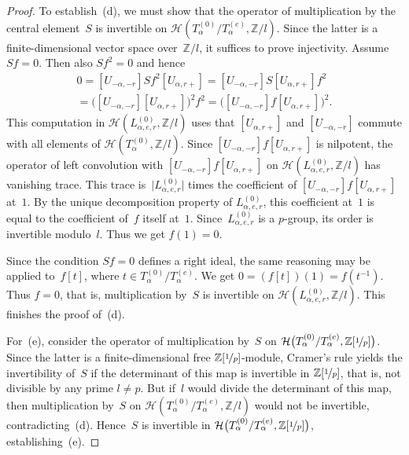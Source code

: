 \documentclass{amsart}
\theoremstyle{remark}
\theoremstyle{definition}
\newcommand*{\nb}{\nobreakdash}%
\newcommand*{\abs}[1]{\lvert#1\rvert}%
\newcommand*{\Z}{\mathbb Z}%
\newcommand*{\Un}{U}%
\newcommand*{\Hecke}{\mathcal H}%
\begin{document}
\begin{proof}
  To establish~(d), we must show that the operator of multiplication by the central element~\(S\) is invertible on \(\Hecke(T_\alpha^{(0)} / T_\alpha^{(e)},\Z/l)\).  Since the latter is a finite-dimensional vector space over~\(\Z/l\), it suffices to prove injectivity.  Assume \(Sf=0\).  Then also \(Sf^2=0\) and hence
  \begin{multline*}
    0 = [\Un_{-\alpha,-r}] Sf^2 [\Un_{\alpha,r+}]
    = [\Un_{-\alpha,-r}] S [\Un_{\alpha,r+}] f^2
    \\= \bigl([\Un_{-\alpha,-r}] [\Un_{\alpha,r+}]\bigr)^2 f^2
    = \bigl([\Un_{-\alpha,-r}] f [\Un_{\alpha,r+}]\bigr)^2.
  \end{multline*}
  This computation in \(\Hecke(L^{(0)}_{\alpha,e,r},\Z/l)\) uses that \([\Un_{\alpha,r+}]\) and \([\Un_{-\alpha,-r}]\) commute with all elements of \(\Hecke(T_\alpha^{(0)},\Z/l)\).  Since \([\Un_{-\alpha,-r}] f [\Un_{\alpha,r+}]\) is nilpotent, the operator of left convolution with \([\Un_{-\alpha,-r}] f [\Un_{\alpha,r+}]\) on \(\Hecke(L^{(0)}_{\alpha,e,r},\Z/l)\) has vanishing trace.  This trace is~\(\abs{L^{(0)}_{\alpha,e,r}}\) times the coefficient of \([\Un_{-\alpha,-r}] f [\Un_{\alpha,r+}]\) at~\(1\).  By the unique decomposition property of \(L^{(0)}_{\alpha,e,r}\), this coefficient at~\(1\) is equal to the coefficient of~\(f\) itself at~\(1\).  Since~\(L^{(0)}_{\alpha,e,r}\) is a \(p\)\nb-group, its order is invertible modulo~\(l\).  Thus we get \(f(1)=0\).

  Since the condition \(Sf=0\) defines a right ideal, the same reasoning may be applied to~\(f [t]\), where \(t\in T_\alpha^{(0)} / T_\alpha^{(e)}\).  We get \(0 = (f [t])(1) = f(t^{-1})\).  Thus \(f=0\), that is, multiplication by~\(S\) is invertible on \(\Hecke(L^{(0)}_{\alpha,e,r},\Z/l)\).  This finishes the proof of~(d).

  For~(e), consider the operator of multiplication by~\(S\) on \(\Hecke \big( T_\alpha^{(0)} / T_\alpha^{(e)},\Z[\nicefrac1p] \big)\).  Since the latter is a finite-dimensional free \(\Z[\nicefrac1p]\)-module, Cramer's rule yields the invertibility of~\(S\) if the determinant of this map is invertible in \(\Z[\nicefrac1p]\), that is, not divisible by any prime \(l\neq p\).  But if~\(l\) would divide the determinant of this map, then multiplication by~\(S\) on \(\Hecke (T_\alpha^{(0)} / T_\alpha^{(e)},\Z/l)\) would not be invertible, contradicting~(d).  Hence~\(S\) is invertible in \(\Hecke \big( T_\alpha^{(0)} / T_\alpha^{(e)},\Z[\nicefrac1p] \big)\), establishing~(e).
\end{proof}
\end{document}

